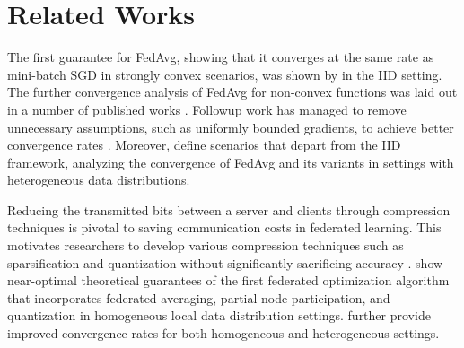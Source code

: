 \section{Related Works}

The first guarantee for FedAvg, showing that it converges at the same rate as mini-batch SGD in strongly convex scenarios, was shown by \citet{stich2018local} in the IID setting. The further convergence analysis of FedAvg for non-convex functions was laid out in a number of published works \citep{wang2018cooperative, haddadpour2019trading, yu2019parallel}. Followup work has managed to remove unnecessary assumptions, such as uniformly bounded gradients, to achieve better convergence rates \citep{wang2018cooperative, stich2019error, haddadpour2019local, khaled2020tighter, woodworth2020local}. Moreover, \citet{li2018federated, haddadpour2019convergence, li2019convergence, khaled2020tighter, karimireddy2020scaffold} define scenarios that depart from the IID framework, analyzing the convergence of FedAvg and its variants in settings with heterogeneous data distributions.   

Reducing the transmitted bits between a server and clients through compression techniques is pivotal to saving communication costs in federated learning. This motivates researchers to develop various compression techniques such as sparsification and quantization without significantly sacrificing accuracy \citep{konevcny2016federated, alistarh2017qsgd, suresh2017distributed, wangni2017gradient, bernstein2018signsgd, wang2018atomo, vogels2019powersgd, horvath2019natural, basu2019qsparse, rothchild2020fetchsgd}. \citet{reisizadeh2020fedpaq} show near-optimal theoretical guarantees of the first federated optimization algorithm that incorporates federated averaging, partial node participation, and quantization in homogeneous local data distribution settings. \citet{haddadpour2021federated} further provide improved convergence rates for both homogeneous and heterogeneous settings.

